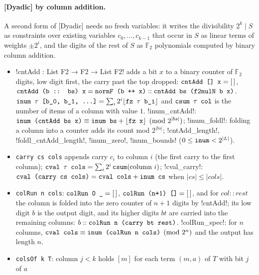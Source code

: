 \paragraph{[Dyadic] by column addition.} A second form of [Dyadic] needs no fresh variables: it
writes the divisibility $2^k\mid S$ as constraints over existing variables $c_0,\dots,c_{k-1}$
that occur in $S$ as linear terms of weights $\pm2^i$, and the digits of the rest of $S$ as $\mathbb
F_2$ polynomials computed by binary column addition.
\begin{itemize}
\item \lean!cntAdd : List F2 → F2 → List F2! adds a bit $x$ to a binary counter of $\mathbb F_2$
  digits, low digit first, the carry past the top dropped:
  $\textnormal{\texttt{cntAdd [] x}}=[\,]$,
  $\textnormal{\texttt{cntAdd (b :: bs) x}} = \textnormal{\texttt{normF (b ++ x)}} :: \textnormal{\texttt{cntAdd bs (f2mulN b x)}}$.
  $\textnormal{\texttt{inum \ensuremath{\tau} [b\_0, b\_1, \ldots]}} = \sum_i 2^i\lfloor\textnormal{\texttt{fz \ensuremath{\tau} b\_i}}\rfloor$ and
  $\textnormal{\texttt{csum \ensuremath{\tau} col}}$ is the number of items of a column with value $1$.
  \lean!inum_cntAdd!: $\textnormal{\texttt{inum (cntAdd bs x)}}\equiv\textnormal{\texttt{inum bs}}+\lfloor\textnormal{\texttt{fz x}}\rfloor\pmod{2^{|bs|}}$;
  \lean!inum_foldl!: folding a column into a counter adds its count mod $2^{|bs|}$; \lean!cntAdd_length!,
  \lean!foldl_cntAdd_length!, \lean!inum_zero!, \lean!inum_bounds! ($0\le\textnormal{\texttt{inum}}<2^{|L|}$).
\item \textnormal{\texttt{carry cs cols}} appends carry $c_i$ to column $i$ (the first carry to the first
  column); $\textnormal{\texttt{cval \ensuremath{\tau} cols}} = \sum_i 2^i\,\textnormal{\texttt{csum}}(\text{column } i)$;
  \lean!cval_carry!: $\textnormal{\texttt{cval (carry cs cols)}} = \textnormal{\texttt{cval cols}}+\textnormal{\texttt{inum cs}}$ when $|cs|\le|cols|$.
\item \textnormal{\texttt{colRun n cols}}: $\textnormal{\texttt{colRun 0 \_}}=[\,]$, $\textnormal{\texttt{colRun (n+1) []}}=[\,]$, and for
  $col::rest$ the column is folded into the zero counter of $n+1$ digits by \lean!cntAdd!; its low
  digit $b$ is the output digit, and its higher digits $bt$ are carried into the remaining columns:
  $b::\textnormal{\texttt{colRun n (carry bt rest)}}$. \lean!colRun_spec!: for $n$ columns,
  $\textnormal{\texttt{cval cols}}\equiv\textnormal{\texttt{inum (colRun n cols)}}\pmod{2^n}$ and the output has length $n$.
\item \textnormal{\texttt{colsOf k T}}: column $j<k$ holds $[m]$ for each term $(m,a)$ of $T$ with bit $j$ of $a$

\end{itemize}
